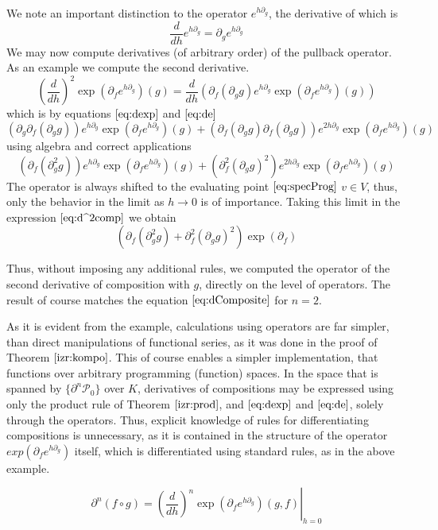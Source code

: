 \documentclass{article}
\newcommand{\dP}{\mathcal{P}}
\newcommand{\D}{\partial}
\begin{document}
 We note an important distinction to the operator $e^{h\D_g}$, the derivative of which is
 \begin{equation}\label{eq:de}
\frac{d}{dh}e^{h\D_g}=\D_ge^{h\D_g}
 \end{equation}
 We may now compute derivatives (of arbitrary order) of the pullback operator. As an example we compute the second derivative.
 $$\left(\frac{d}{dh}\right)^2\exp\left(\D_fe^{h\D_g}\right)(g)=\frac{d}{dh}\left(\D_f(\D_gg)e^{h\D_g}\exp\left(\D_fe^{h\D_g}\right)(g)\right)$$
 which is by equations $\eqref{eq:dexp}$ and $\eqref{eq:de}$
 $$(\D_g\D_f(\D_gg))e^{h\D_g}\exp(\D_fe^{h\D_g})(g)+(\D_f(\D_gg)\D_f(\D_gg))e^{2h\D_g}\exp(\D_fe^{h\D_g})(g)$$
 using algebra and correct applications
 \begin{equation}\label{eq:d^2comp}
 \left(\D_f(\D^2_gg)\right)e^{h\D_g}\exp(\D_fe^{h\D_g})(g)+(\D^2_f(\D_gg)^2)e^{2h\D_g}\exp(\D_fe^{h\D_g})(g)
 \end{equation}
 The operator is always shifted to the evaluating point $\eqref{eq:specProg}$ $v\in V$, thus, only the behavior in the limit as $h\to 0$ is of importance. Taking this limit in the expression $\eqref{eq:d^2comp}$ we obtain
 \begin{equation}
	\left(\D_f(\D^2_gg)+\D^2_f(\D_gg)^2\right)\exp(\D_f)
 \end{equation}
 
 Thus, without imposing any additional rules, we computed the operator of the second derivative of composition with $g$, directly on the level of operators. The result of course matches the equation $\eqref{eq:dComposite}$ for $n=2$.
 
 As it is evident from the example, calculations using operators are far simpler, than direct manipulations of functional series, as it was done in the proof of Theorem $\ref{izr:kompo}$. This of course enables a simpler implementation, that functions over arbitrary programming (function) spaces. In the space that is spanned by $\{\D^n\dP_0\}$ over $K$, derivatives of compositions may be expressed using only the product rule of Theorem $\ref{izr:prod}$, and $\eqref{eq:dexp}$ and $\eqref{eq:de}$, solely through the operators. Thus, explicit knowledge of rules for differentiating compositions is unnecessary, as it is contained in the structure of the operator $exp(\D_fe^{h\D_g})$ itself, which is differentiated using standard rules, as in the above example.
 
 \begin{equation}\label{eq:dkompo}
 \D^n(f\circ g)=\left.\left(\frac{d}{dh}\right)^n\exp\left(\D_fe^{h\D_g}\right)(g,f)\right|_{h=0}
 \end{equation}
 
\end{document}
